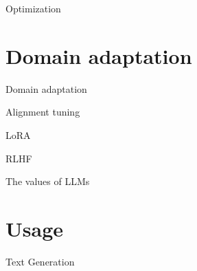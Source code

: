 \documentclass[10pt]{beamer}
\begin{document}
\begin{frame}{Optimization}




\end{frame}



\section{Domain adaptation}

\begin{frame}{Domain adaptation}



\end{frame}


\begin{frame}{Alignment tuning}




\end{frame}

\begin{frame}{LoRA}


\end{frame}


\begin{frame}{RLHF}


\end{frame}

\begin{frame}{The values of LLMs}


\end{frame}


\section{Usage}

\begin{frame}{Text Generation}


\end{frame}
\end{document}
